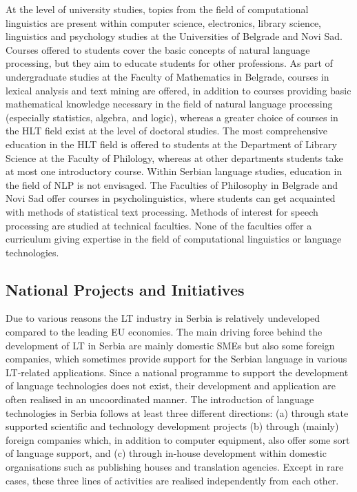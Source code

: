 \begin{multicols}{2}
At the level of university studies, topics from the field of computational linguistics are present within computer science, electronics, library science, linguistics and psychology studies at the Universities of Belgrade and Novi Sad. Courses offered to students cover the basic concepts of natural language processing, but they aim to educate students for other professions. As part of undergraduate studies at the Faculty of Mathematics in Belgrade, courses in lexical analysis and text mining are offered, in addition to courses providing basic mathematical knowledge necessary in the field of natural language processing (especially statistics, algebra, and logic), whereas a greater choice of courses in the HLT field exist at the level of doctoral studies. The most comprehensive education in the HLT field is offered to students at the Department of Library Science at the Faculty of Philology, whereas at other departments students take at most one introductory course. Within Serbian language studies, education in the field of NLP is not envisaged. The Faculties of Philosophy in Belgrade and Novi Sad offer courses in psycholinguistics, where students can get acquainted with methods of statistical text processing. Methods of interest for speech processing are studied at technical faculties. None of the faculties offer a curriculum giving expertise in the field of computational linguistics or language technologies. 
 

 \subsection {National Projects and Initiatives}

Due to various reasons the LT industry in Serbia is relatively undeveloped compared to the leading EU economies. The main driving force behind the development of LT in Serbia are mainly domestic SMEs but also some foreign companies, which sometimes provide support for the Serbian language in various LT-related applications. Since a national programme to support the development of language technologies does not exist, their development and application are often realised in an uncoordinated manner. The introduction of language technologies in Serbia follows at least three different directions: (a) through state supported scientific and technology development projects (b) through (mainly) foreign companies which, in addition to computer equipment, also offer some sort of language support, and (c) through in-house development within domestic organisations such as publishing houses and translation agencies. Except in rare cases, these three lines of activities are realised independently from each other. 


\end{multicols}
